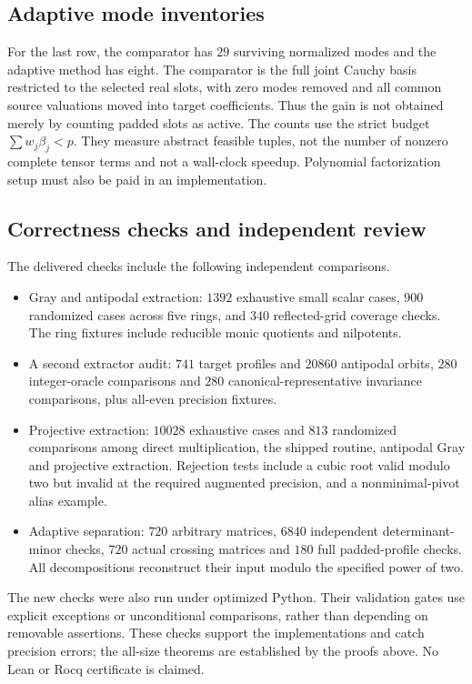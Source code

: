 \documentclass[11pt,letterpaper]{article}
\theoremstyle{definition}\newtheorem{definition}[theorem]{Definition}
\theoremstyle{remark}\newtheorem{remark}[theorem]{Remark}
\begin{document}
\subsection{Adaptive mode inventories}

For the last row, the comparator has $29$ surviving normalized modes and
the adaptive method has eight. The comparator is the full joint Cauchy
basis restricted to the selected real slots, with zero modes removed and
all common source valuations moved into target coefficients. Thus the
gain is not obtained merely by counting padded slots as active.
The counts use the strict budget $\sum w_j\beta_j<p$. They measure
abstract feasible tuples, not the number of nonzero complete tensor terms
and not a wall-clock speedup. Polynomial factorization setup must also be
paid in an implementation.

\subsection{Correctness checks and independent review}
The delivered checks include the following independent comparisons.
\begin{itemize}
\item Gray and antipodal extraction: $1392$ exhaustive small scalar cases,
$900$ randomized cases across five rings, and $340$ reflected-grid coverage
checks. The ring fixtures include reducible monic quotients and nilpotents.
\item A second extractor audit: $741$ target profiles and $20860$ antipodal
orbits, $280$ integer-oracle comparisons and $280$ canonical-representative
invariance comparisons, plus all-even precision fixtures.
\item Projective extraction: $10028$ exhaustive cases and $813$ randomized
comparisons among direct multiplication, the shipped routine, antipodal
Gray and projective extraction. Rejection tests include a cubic root valid
modulo two but invalid at the required augmented precision, and a
nonminimal-pivot alias example.
\item Adaptive separation: $720$ arbitrary matrices, $6840$ independent
determinant-minor checks, $720$ actual crossing matrices and $180$ full
padded-profile checks. All decompositions reconstruct their input modulo
the specified power of two.
\end{itemize}
The new checks were also run under optimized Python. Their validation gates
use explicit exceptions or unconditional comparisons, rather than depending
on removable assertions. These checks support the implementations and catch
precision errors; the all-size theorems are established by the proofs above.
No Lean or Rocq certificate is claimed.
\end{document}
